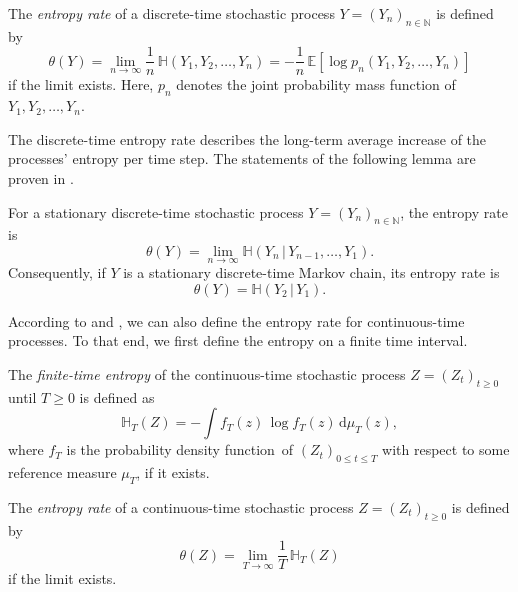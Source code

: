 \documentclass[smallextended]{svjour3}
\newcommand{\N}{\mathbb{N}}
\newcommand{\E}{\mathbb{E}}
\renewcommand{\H}{\mathbb{H}}
\newcommand{\liml}{\lim\limits}
\newcommand{\dd}[1]{\,\mathrm{d}#1}
\newcommand{\pdf}{probability density function}
\begin{document}
\begin{definition}%
\label{def:entropy_rate}
	The \emph{entropy rate} of a discrete-time stochastic process $Y=(Y_n)_{n\in \N}$ is defined by
	\begin{equation*}
		\theta(Y) = \liml_{n\to\infty} \frac{1}{n}\,\H(Y_1,Y_2,\ldots,Y_n) = -\frac{1}{n}\,\E\left[\log p_n(Y_1,Y_2,\ldots,Y_n)\right]
	\end{equation*}
	if the limit exists.
	Here, $p_n$ denotes the joint probability mass function of $Y_1,Y_2,\ldots,Y_n$.
\end{definition}

The discrete-time entropy rate describes the long-term average increase of the processes' entropy per time step.
The statements of the following lemma are proven in \citet[Theorem~4.2.1]{Cover2006}.

\begin{lemma}\label{lem:entropy_rate_st_MC}
	For a stationary discrete-time stochastic process $Y=(Y_n)_{n\in\N}$, the entropy rate is
	\begin{equation*}
		\theta(Y) = \liml_{n\to\infty} \H(Y_n\,|\,Y_{n-1},\ldots,Y_1).
	\end{equation*}
	Consequently, if $Y$ is a stationary discrete-time Markov chain, its entropy rate is
	\begin{equation*}
		\theta(Y) = \H(Y_2\,|\,Y_1).
	\end{equation*}
\end{lemma}

According to \citet{Dumitrescu1988MICAS} and \citet{Girardin2003JAP}, we can also define the entropy rate for continuous-time processes.
To that end, we first define the entropy on a finite time interval.

\begin{definition}%
	The \emph{finite-time entropy} of the continuous-time stochastic process $Z=(Z_t)_{t\geq0}$ until $T\geq0$ is defined as
	\begin{equation*}
		\H_T(Z) = - \int f_T(z)\,\log f_T(z)\dd{\mu_T(z)},	 
	\end{equation*}
	where $f_T$ is the \pdf\ of $(Z_t)_{0\leq t\leq T}$ with respect to some reference measure $\mu_T$, if it exists.
\end{definition}

\begin{definition}%
	The \emph{entropy rate} of a continuous-time stochastic process $Z=(Z_t)_{t\geq0}$ is defined by
	\begin{equation*}
		\theta(Z) = \liml_{T\to\infty} \frac{1}{T}\,\H_T(Z)
	\end{equation*}
	if the limit exists.
\end{definition}
\end{document}
